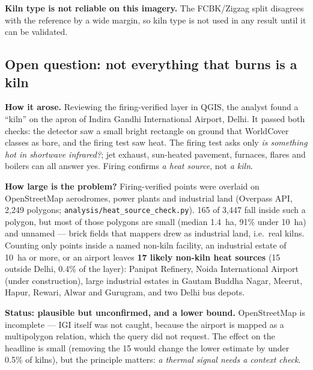 \documentclass[11pt,a4paper]{article}
\begin{document}
\textbf{Kiln type is not reliable on this imagery.} The FCBK/Zigzag split
disagrees with the reference by a wide margin, so kiln type is not used in any
result until it can be validated.

\subsection{Open question: not everything that burns is a kiln}
\textbf{How it arose.} Reviewing the firing-verified layer in QGIS, the analyst
found a ``kiln'' on the apron of Indira Gandhi International Airport, Delhi. It
passed both checks: the detector saw a small bright rectangle on ground that
WorldCover classes as bare, and the firing test saw heat. The firing test asks
only \emph{is something hot in shortwave infrared?}; jet exhaust, sun-heated
pavement, furnaces, flares and boilers can all answer yes. Firing confirms
\emph{a heat source}, not \emph{a kiln}.

\textbf{How large is the problem?} Firing-verified points were overlaid on
OpenStreetMap aerodromes, power plants and industrial land (Overpass API,
2{,}249 polygons; \texttt{analysis/heat\_source\_check.py}). 165 of 3{,}447 fall
inside such a polygon, but most of those polygons are small (median 1.4~ha,
91\% under 10~ha) and unnamed --- brick fields that mappers drew as industrial
land, i.e.\ real kilns. Counting only points inside a named non-kiln facility,
an industrial estate of 10~ha or more, or an airport leaves \textbf{17 likely
non-kiln heat sources} (15 outside Delhi, 0.4\% of the layer): Panipat Refinery,
Noida International Airport (under construction), large industrial estates in
Gautam Buddha Nagar, Meerut, Hapur, Rewari, Alwar and Gurugram, and two Delhi
bus depots.

\textbf{Status: plausible but unconfirmed, and a lower bound.} OpenStreetMap is
incomplete --- IGI itself was not caught, because the airport is mapped as a
multipolygon relation, which the query did not request. The effect on the
headline is small (removing the 15 would change the lower estimate by under
0.5\% of kilns), but the principle matters: \emph{a thermal signal needs a
context check}.
\end{document}
